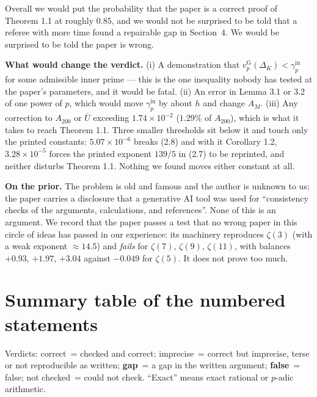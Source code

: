 \documentclass[11pt]{article}
\theoremstyle{definition}
\newcommand{\Ub}{\overline{U}}
\newcommand{\vG}{v_p^{\mathrm{G}}}
\newcommand{\gin}{\gamma_p^{\mathrm{in}}}
\newcommand{\OK}{correct}
\newcommand{\IM}{imprecise}
\newcommand{\GP}{\textbf{gap}}
\newcommand{\FA}{\textbf{false}}
\newcommand{\NC}{not checked}
\begin{document}
\noindent Overall we would put the probability that the paper is a correct proof of Theorem 1.1
at roughly $0.85$, and we would not be surprised to be told that a referee with more time found
a repairable gap in Section~4. We would be surprised to be told the paper is wrong.

\medskip\noindent\textbf{What would change the verdict.} (i) A demonstration that
$\vG(\Delta_K)<\gin$ for some admissible inner prime --- this is the one inequality nobody has
tested at the paper's parameters, and it would be fatal. (ii) An error in Lemma 3.1 or 3.2 of
one power of $p$, which would move $\gin$ by about $h$ and change $A_M$. (iii) Any correction to
$A_{200}$ or $\Ub$ exceeding $1.74\times10^{-2}$ ($1.29\%$ of $A_{200}$), which is what it takes
to reach Theorem 1.1. Three smaller thresholds sit below it and touch only the printed
constants: $5.07\times10^{-6}$ breaks (2.8) and with it Corollary 1.2, $3.28\times10^{-5}$ forces
the printed exponent $139/5$ in (2.7) to be reprinted, and neither disturbs Theorem 1.1.
Nothing we found moves either constant at all.

\medskip\noindent\textbf{On the prior.} The problem is old and famous and the author is
unknown to us; the paper carries a disclosure that a generative AI tool was used for
``consistency checks of the arguments, calculations, and references''. None of this is an
argument. We record that the paper passes a test that no wrong paper in this circle of ideas
has passed in our experience: its machinery reproduces $\zeta(3)$ (with a weak exponent
$\approx14.5$) and \emph{fails} for $\zeta(7)$, $\zeta(9)$, $\zeta(11)$, with balances
$+0.93$, $+1.97$, $+3.04$ against $-0.049$ for $\zeta(5)$. It does not prove too much.

\clearpage

\section{Summary table of the numbered statements}

Verdicts: \OK\ = checked and correct; \IM\ = correct but imprecise, terse or
not reproducible as written; \GP\ = a gap in the written argument; \FA\ = false; \NC\ = could
not check. ``Exact'' means exact rational or $p$-adic arithmetic.
\end{document}
